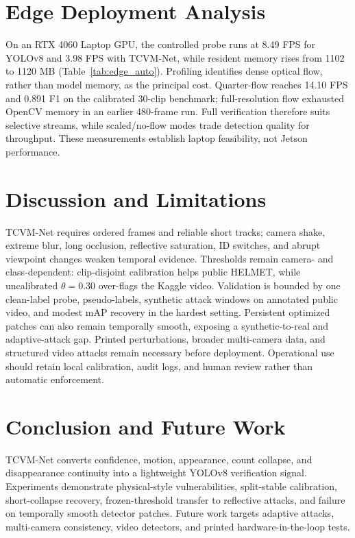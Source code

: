 \documentclass[runningheads,a4paper]{llncs}
\newcommand{\method}{TCVM-Net}
\begin{document}
\section{Edge Deployment Analysis}


On an RTX 4060 Laptop GPU, the controlled probe runs at 8.49 FPS for YOLOv8 and 3.98 FPS with \method{}, while resident memory rises from 1102 to 1120 MB (Table~\ref{tab:edge_auto}). Profiling identifies dense optical flow, rather than model memory, as the principal cost. Quarter-flow reaches 14.10 FPS and 0.891 F1 on the calibrated 30-clip benchmark; full-resolution flow exhausted OpenCV memory in an earlier 480-frame run. Full verification therefore suits selective streams, while scaled/no-flow modes trade detection quality for throughput. These measurements establish laptop feasibility, not Jetson performance.

\section{Discussion and Limitations}

\method{} requires ordered frames and reliable short tracks; camera shake, extreme blur, long occlusion, reflective saturation, ID switches, and abrupt viewpoint changes weaken temporal evidence. Thresholds remain camera- and class-dependent: clip-disjoint calibration helps public HELMET, while uncalibrated $\theta=0.30$ over-flags the Kaggle video. Validation is bounded by one clean-label probe, pseudo-labels, synthetic attack windows on annotated public video, and modest mAP recovery in the hardest setting. Persistent optimized patches can also remain temporally smooth, exposing a synthetic-to-real and adaptive-attack gap. Printed perturbations, broader multi-camera data, and structured video attacks remain necessary before deployment. Operational use should retain local calibration, audit logs, and human review rather than automatic enforcement.

\section{Conclusion and Future Work}

\method{} converts confidence, motion, appearance, count collapse, and disappearance continuity into a lightweight YOLOv8 verification signal. Experiments demonstrate physical-style vulnerabilities, split-stable calibration, short-collapse recovery, frozen-threshold transfer to reflective attacks, and failure on temporally smooth detector patches. Future work targets adaptive attacks, multi-camera consistency, video detectors, and printed hardware-in-the-loop tests.

\begingroup


\endgroup
\end{document}
